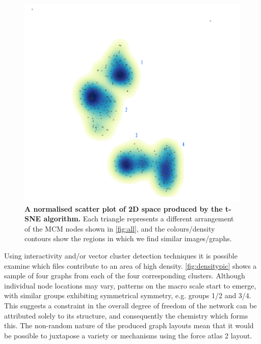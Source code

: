     \begin{figure}[H]
         \centering
    \includegraphics[width=.6\textwidth]{figures_c1/beijingtest/density.png}
     \caption{\textbf{A normalised scatter plot of 2D space produced by the t-SNE algorithm.} Each triangle represents a different arrangement of the MCM nodes shown in \autoref{fig:all}, and the colours/density contours show the regions in which we find similar images/graphs. }
     \label{fig:densty}
     \end{figure}

Using interactivity and/or vector cluster detection techniques it is possible examine which files contribute to an area of high density. \autoref{fig:densitypic} shows a sample of four graphs from each of the four corresponding clusters. Although individual node locations may vary, patterns on the macro scale start to emerge, with similar groups exhibiting symmetrical symmetry, e.g. groups 1/2 and 3/4. This suggests a constraint in the overall degree of freedom of the network can be attributed solely to its structure, and consequently the chemistry which forms this. The non-random nature of the produced graph layouts mean that it would be possible to juxtapose a variety or mechanisms using the force atlas 2 layout.


